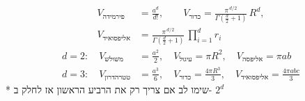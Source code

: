 \begin{cheatformula}[קומבינטוריקה]
    

\begin{table}[H]
  \centering
\end{table}
\end{cheatformula}

\begin{cheatformula}
     \begin{align*}
    V_{\text{פירמידה}} &= \frac{a^{d}}{d!}, \qquad
    V_{\text{כדור}} = \frac{\pi^{\,d/2}}{\Gamma\left(\tfrac{d}{2} + 1\right)} \, R^{d}, \\
    V_{\text{אליפסואיד}} &= \frac{\pi^{\,d/2}}{\Gamma\left(\tfrac{d}{2} + 1\right)} \, \prod_{i=1}^{d} r_{i}
\end{align*}
\begin{align*}
d = 2: \quad V_{\text{משולש}} &= \frac{a^2}{2}, \quad V_{\text{עיגול}} = \pi R^2, \quad V_{\text{אליפסה}} = \pi ab \\
d = 3: \quad V_{\text{טטרהדרון}} &= \frac{a^3}{6}, \quad V_{\text{כדור}} = \frac{4\pi R^3}{3}, \quad V_{\text{אליפסואיד}} = \frac{4\pi abc}{3}
\end{align*}
* שימו לב אם צריך רק את הרביע הראשון אז לחלק ב- $2^d$
\end{cheatformula}


